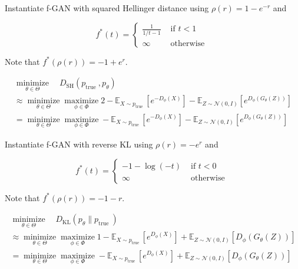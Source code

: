 \begin{concept}
    Instantiate f-GAN with squared Hellinger distance using $\rho(r)=1-e^{-r}$ and

    $$
    f^{*}(t)= \begin{cases}\frac{1}{1 / t-1} & \text { if } t<1 \\ \infty & \text { otherwise }\end{cases}
    $$

    Note that $f^{*}(\rho(r))=-1+e^{r}$.

    $$
    \begin{gathered}
    \underset{\theta \in \Theta}{\operatorname{minimize}} \quad D_{\mathrm{SH}}\left(p_{\text {true }}, p_{\theta}\right) \\
    \approx \underset{\theta \in \Theta}{\operatorname{minimize}} \underset{\phi \in \Phi}{\operatorname{maximize}} 2-\mathbb{E}_{X \sim p_{\text {true }}}\left[e^{-D_{\phi}(X)}\right]-\mathbb{E}_{Z \sim \mathcal{N}(0, I)}\left[e^{D_{\phi}\left(G_{\theta}(Z)\right)}\right] \\
    = \underset{\theta \in \Theta}{\operatorname{minimize}} \underset{\phi \in \Phi}{\operatorname{maximize}} -\mathbb{E}_{X \sim p_{\text {true }}}\left[e^{-D_{\phi}(X)}\right]-\mathbb{E}_{Z \sim \mathcal{N}(0, I)}\left[e^{D_{\phi}\left(G_{\theta}(Z)\right)}\right]
    \end{gathered}
    $$
\end{concept}

\begin{concept}
    Instantiate f-GAN with reverse KL using $\rho(r)=-e^{r}$ and

    $$
    f^{*}(t)= \begin{cases}-1-\log (-t) & \text { if } t<0 \\ \infty & \text { otherwise }\end{cases}
    $$

    Note that $f^{*}(\rho(r))=-1-r$.

    $$
    \begin{gathered}
    \underset{\theta \in \Theta}{\operatorname{minimize}} \quad D_{\mathrm{KL}}\left(p_{\theta} \| p_{\text {true }}\right) \\
    \approx \underset{\theta \in \Theta}{\operatorname{minimize}} \underset{\phi \in \Phi}{\operatorname{maximize}} 1-\mathbb{E}_{X \sim p_{\text {true }}}\left[e^{D_{\phi}(X)}\right]+\mathbb{E}_{Z \sim \mathcal{N}(0, I)}\left[D_{\phi}\left(G_{\theta}(Z)\right)\right] \\
    =\underset{\theta \in \Theta}{\operatorname{minimize}} \underset{\phi \in \Phi}{\operatorname{maximize}}-\mathbb{E}_{X \sim p_{\text {true }}}\left[e^{D_{\phi}(X)}\right]+\mathbb{E}_{Z \sim \mathcal{N}(0, I)}\left[D_{\phi}\left(G_{\theta}(Z)\right)\right]
    \end{gathered}
    $$
\end{concept}

